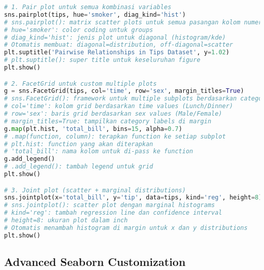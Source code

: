 \begin{lstlisting}[language=python, caption={FacetGrid dan PairPlot untuk Multiple Variables}, style=python]
# 1. Pair plot untuk semua kombinasi variables
sns.pairplot(tips, hue='smoker', diag_kind='hist')
# sns.pairplot(): matrix scatter plots untuk semua pasangan kolom numerik
# hue='smoker': color coding untuk groups
# diag_kind='hist': jenis plot untuk diagonal (histogram/kde)
# Otomatis membuat: diagonal=distribution, off-diagonal=scatter
plt.suptitle('Pairwise Relationships in Tips Dataset', y=1.02)
# plt.suptitle(): super title untuk keseluruhan figure
plt.show()

# 2. FacetGrid untuk custom multiple plots
g = sns.FacetGrid(tips, col='time', row='sex', margin_titles=True)
# sns.FacetGrid(): framework untuk multiple subplots berdasarkan categories
# col='time': kolom grid berdasarkan time values (Lunch/Dinner)
# row='sex': baris grid berdasarkan sex values (Male/Female)
# margin_titles=True: tampilkan category labels di margin
g.map(plt.hist, 'total_bill', bins=15, alpha=0.7)
# .map(function, column): terapkan function ke setiap subplot
# plt.hist: function yang akan diterapkan
# 'total_bill': nama kolom untuk di-pass ke function
g.add_legend()
# .add_legend(): tambah legend untuk grid
plt.show()

# 3. Joint plot (scatter + marginal distributions)
sns.jointplot(x='total_bill', y='tip', data=tips, kind='reg', height=8)
# sns.jointplot(): scatter plot dengan marginal histograms
# kind='reg': tambah regression line dan confidence interval
# height=8: ukuran plot dalam inch
# Otomatis menambah histogram di margin untuk x dan y distributions
plt.show()
\end{lstlisting}

\subsection*{Advanced Seaborn Customization}

